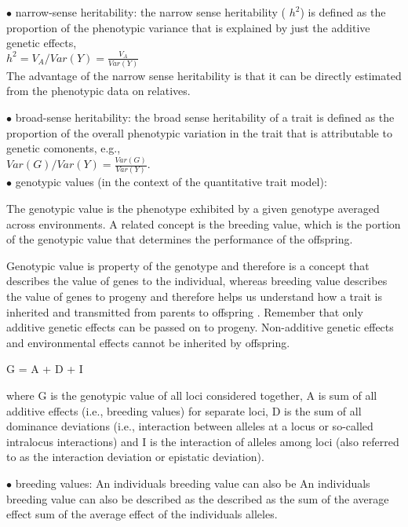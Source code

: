 \documentclass{article}
\begin{document}
\vspace{1pc}
$\bullet$ narrow-sense heritability:
the narrow sense heritability ( $h^2 $) is defined as the proportion of the phenotypic variance that is explained by just the additive genetic effects, \\

	$ 
		h^2 = V_A / Var(Y) = \frac{V_A}{Var(Y)} 
	$ \\
	
	The advantage of the narrow sense heritability is that it can be directly estimated from the phenotypic data on relatives.

\vspace{1pc}
$\bullet$ broad-sense heritability:
the broad sense heritability of a trait is defined as the proportion of the overall phenotypic variation in the trait that is attributable to genetic comonents, e.g., \\

	$ 
		Var(G)/Var(Y) = \frac{Var(G)}{Var(Y)}.
	$ \\
	



\vspace{1pc}
$\bullet$ genotypic values (in the context of the quantitative trait model):

The genotypic value is the phenotype exhibited by a given genotype averaged across environments. A related concept is the breeding value, which is the portion of the genotypic value that determines the performance of the offspring.

Genotypic value is property of the genotype and therefore is a concept that describes the value of genes to the individual, whereas breeding value describes the value of genes to progeny and therefore helps us understand how a trait is inherited and transmitted from parents to offspring . Remember that only additive genetic effects can be passed on to progeny. Non-additive genetic effects and environmental effects cannot be inherited by offspring.

  G = A + D + I

where G is the genotypic value of all loci considered together, A is sum of all additive effects (i.e., breeding values) for separate loci, D is the sum of all dominance deviations (i.e., interaction between alleles at a locus or so-called intralocus interactions) and I is the interaction of alleles among loci (also referred to as the interaction deviation or epistatic deviation).


\vspace{1pc}
$\bullet$ breeding values:
An individuals breeding value can also be An individuals breeding value can also be
described as the described as the sum of the average effect sum of the average effect of the
individuals alleles.
\end{document}
